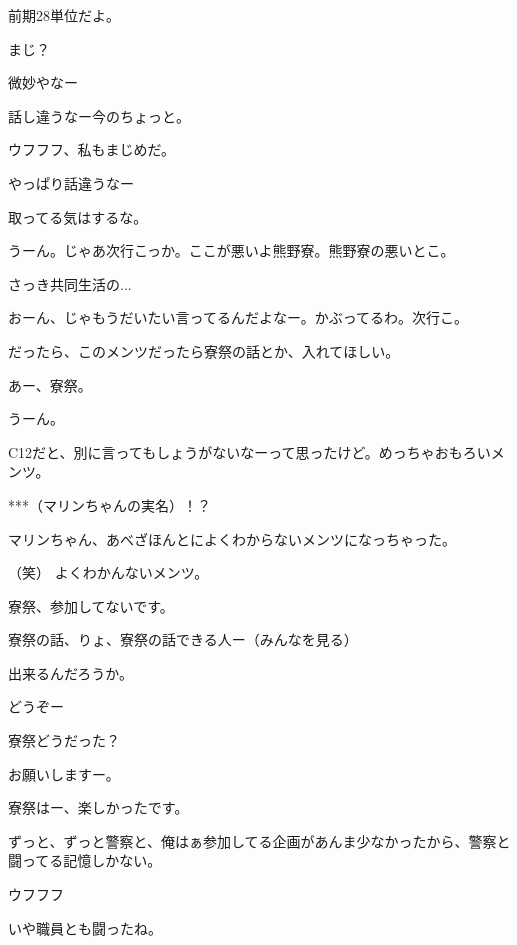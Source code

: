 \begin{multicols}{3}
{        前期28単位だよ。

        まじ？

        微妙やなー

        話し違うなー今のちょっと。

        ウフフフ、私もまじめだ。

        やっぱり話違うなー

        取ってる気はするな。

        うーん。じゃあ次行こっか。ここが悪いよ熊野寮。熊野寮の悪いとこ。

        さっき共同生活の...

        おーん、じゃもうだいたい言ってるんだよなー。かぶってるわ。次行こ。

        だったら、このメンツだったら寮祭の話とか、入れてほしい。

        あー、寮祭。

        うーん。

        C12だと、別に言ってもしょうがないなーって思ったけど。めっちゃおもろいメンツ。

        ***（マリンちゃんの実名）！？

        マリンちゃん、あべざほんとによくわからないメンツになっちゃった。

        （笑） よくわかんないメンツ。

        寮祭、参加してないです。

        寮祭の話、りょ、寮祭の話できる人ー（みんなを見る）

        出来るんだろうか。

        どうぞー

        寮祭どうだった？

        お願いしますー。

        寮祭はー、楽しかったです。

        ずっと、ずっと警察と、俺はぁ参加してる企画があんま少なかったから、警察と闘ってる記憶しかない。

        ウフフフ

        いや職員とも闘ったね。

}
\end{multicols}
